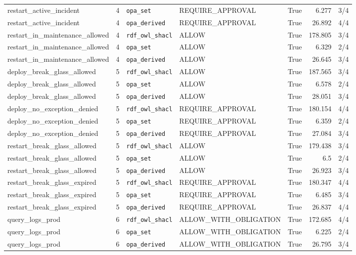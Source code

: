 \begin{table}[h!]
\begin{tabular}{l c l l c r c}
restart\_active\_incident & 4 & \texttt{opa\_set} & REQUIRE_APPROVAL & True & 6.277 & 3/4 \\
restart\_active\_incident & 4 & \texttt{opa\_derived} & REQUIRE_APPROVAL & True & 26.892 & 4/4 \\
restart\_in\_maintenance\_allowed & 4 & \texttt{rdf\_owl\_shacl} & ALLOW & True & 178.805 & 3/4 \\
restart\_in\_maintenance\_allowed & 4 & \texttt{opa\_set} & ALLOW & True & 6.329 & 2/4 \\
restart\_in\_maintenance\_allowed & 4 & \texttt{opa\_derived} & ALLOW & True & 26.645 & 3/4 \\
deploy\_break\_glass\_allowed & 5 & \texttt{rdf\_owl\_shacl} & ALLOW & True & 187.565 & 3/4 \\
deploy\_break\_glass\_allowed & 5 & \texttt{opa\_set} & ALLOW & True & 6.578 & 2/4 \\
deploy\_break\_glass\_allowed & 5 & \texttt{opa\_derived} & ALLOW & True & 28.051 & 3/4 \\
deploy\_no\_exception\_denied & 5 & \texttt{rdf\_owl\_shacl} & REQUIRE_APPROVAL & True & 180.154 & 4/4 \\
deploy\_no\_exception\_denied & 5 & \texttt{opa\_set} & REQUIRE_APPROVAL & True & 6.359 & 2/4 \\
deploy\_no\_exception\_denied & 5 & \texttt{opa\_derived} & REQUIRE_APPROVAL & True & 27.084 & 3/4 \\
restart\_break\_glass\_allowed & 5 & \texttt{rdf\_owl\_shacl} & ALLOW & True & 179.438 & 3/4 \\
restart\_break\_glass\_allowed & 5 & \texttt{opa\_set} & ALLOW & True & 6.5 & 2/4 \\
restart\_break\_glass\_allowed & 5 & \texttt{opa\_derived} & ALLOW & True & 26.923 & 3/4 \\
restart\_break\_glass\_expired & 5 & \texttt{rdf\_owl\_shacl} & REQUIRE_APPROVAL & True & 180.347 & 4/4 \\
restart\_break\_glass\_expired & 5 & \texttt{opa\_set} & REQUIRE_APPROVAL & True & 6.485 & 3/4 \\
restart\_break\_glass\_expired & 5 & \texttt{opa\_derived} & REQUIRE_APPROVAL & True & 26.837 & 4/4 \\
query\_logs\_prod & 6 & \texttt{rdf\_owl\_shacl} & ALLOW_WITH_OBLIGATION & True & 172.685 & 4/4 \\
query\_logs\_prod & 6 & \texttt{opa\_set} & ALLOW_WITH_OBLIGATION & True & 6.225 & 2/4 \\
query\_logs\_prod & 6 & \texttt{opa\_derived} & ALLOW_WITH_OBLIGATION & True & 26.795 & 3/4 \\

\end{tabular}
\end{table}
